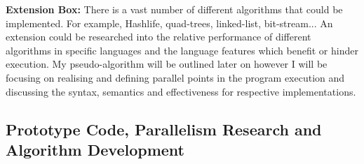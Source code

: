 \documentclass[11pt]{article} %
\begin{document}
\begin{mdframed}
{\bf Extension Box:} There is a vast number of different algorithms that could be implemented. For example, Hashlife, quad-trees, linked-list, bit-stream... An extension could be researched into the relative performance of different algorithms in specific languages and the language features which benefit or hinder execution. My pseudo-algorithm will be outlined later on however I will be focusing on realising and defining parallel points in the program execution and discussing the syntax, semantics and effectiveness for respective implementations. 
\end{mdframed} 
\subsection{Prototype Code, Parallelism Research and Algorithm Development}
\end{document}

